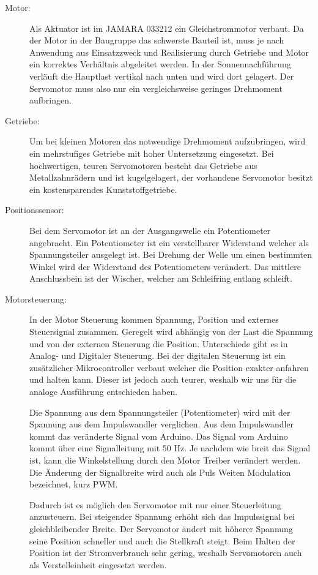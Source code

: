\begin{description}
  \item[Motor:] Als Aktuator ist im JAMARA 033212 ein Gleichstrommotor verbaut. Da der Motor in der Baugruppe das schwerste Bauteil ist, muss je nach Anwendung aus Einsatzzweck und Realisierung durch Getriebe und Motor ein korrektes Verhältnis abgeleitet werden. In der Sonnennachführung verläuft die Hauptlast vertikal nach unten und wird dort gelagert. Der Servomotor muss also nur ein vergleichsweise geringes Drehmoment aufbringen.

  \item[Getriebe:] Um bei kleinen Motoren das notwendige Drehmoment aufzubringen, wird ein mehrstufiges Getriebe mit hoher Untersetzung eingesetzt. Bei hochwertigen, teuren Servomotoren besteht das Getriebe aus Metallzahnrädern und ist kugelgelagert, der vorhandene Servomotor besitzt ein kostensparendes Kunststoffgetriebe.

  \item[Positionssensor:] Bei dem Servomotor ist an der Ausgangswelle ein Potentiometer angebracht. Ein Potentiometer ist ein verstellbarer Widerstand welcher als Spannungsteiler ausgelegt ist.  Bei Drehung der Welle um einen bestimmten Winkel wird der Widerstand des Potentiometers verändert. Das mittlere Anschlussbein ist der Wischer, welcher am Schleifring entlang schleift. 

  \item [Motorsteuerung:] In der Motor Steuerung kommen Spannung, Position und externes Steuersignal zusammen. Geregelt wird abhängig von der Last die Spannung und von der externen Steuerung die Position. Unterschiede gibt es in Analog- und Digitaler Steuerung. Bei der digitalen Steuerung ist ein zusätzlicher Mikrocontroller verbaut welcher die Position exakter anfahren und halten kann. Dieser ist jedoch auch teurer, weshalb wir uns für die analoge Ausführung entschieden haben.
  
  Die Spannung aus dem Spannungsteiler (Potentiometer) wird mit der Spannung aus dem Impulswandler verglichen. Aus dem Impulswandler kommt das veränderte Signal vom Arduino. Das Signal vom Arduino kommt über eine Signalleitung mit 50 Hz. Je nachdem wie breit das Signal ist, kann die Winkelstellung durch den Motor Treiber verändert werden. Die Änderung der Signalbreite wird auch als Puls Weiten Modulation bezeichnet, kurz PWM. \cite{Dejan:2018,Ibrahim:2018}
  
  Dadurch ist es möglich den Servomotor mit nur einer Steuerleitung anzusteuern. Bei steigender Spannung erhöht sich das Impulssignal bei gleichbleibender Breite. Der Servomotor ändert mit höherer Spannung seine Position schneller und auch die Stellkraft steigt. Beim Halten der Position ist der Stromverbrauch sehr gering, weshalb Servomotoren auch als Verstelleinheit eingesetzt werden.


\end{description}
